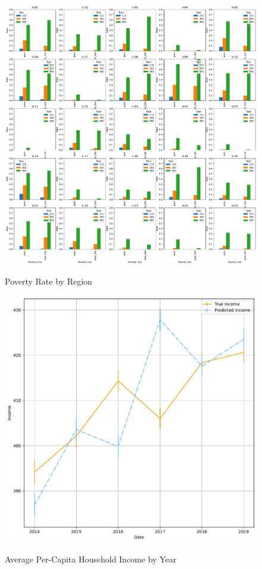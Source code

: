\begin{figure}[H]
    \centering
    \caption{Poverty Rate by Region}
    \includegraphics[width=\textwidth]{../figures/fig4_prediction_vs_true_poverty_rate_regions.pdf}
    \label{fig:enter-label}
\end{figure}



\begin{figure}[H]
    \centering
    \caption{Average Per-Capita  Household Income by Year}
    \includegraphics[width=\textwidth]{../figures/fig5_average_income_time_series.pdf}
    \label{fig:enter-label}
\end{figure}



